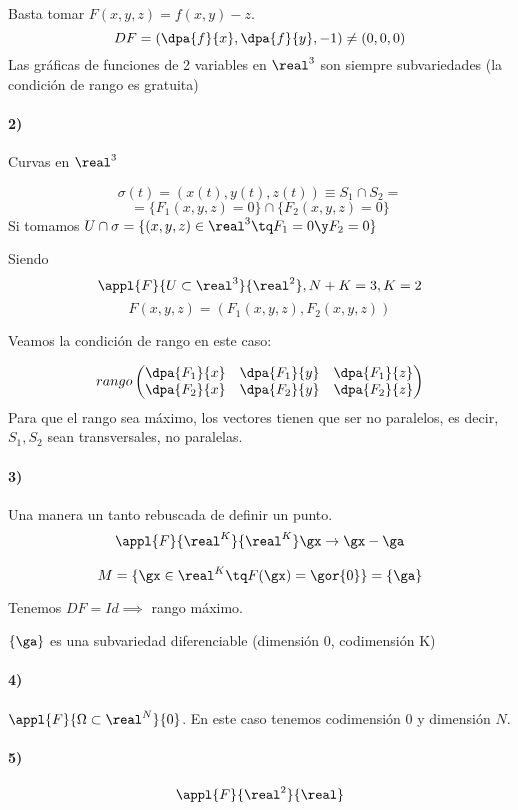   Basta tomar $F(x,y,z) = f(x,y)-z$.
  \[DF = \left(\dpa{f}{x},\dpa{f}{y},-1\right) \neq (0,0,0)\]
  Las gráficas de funciones de 2 variables en $\real^3$ son siempre subvariedades (la condición de rango es gratuita)
  
\paragraph{2)}  Curvas en $\real^3$
  
  \[\sigma(t) = (x(t),y(t),z(t))\equiv S_1 \cap S_2 = \]
  \[= \{F_1(x,y,z) = 0\}\cap \{F_2(x,y,z) = 0\}\]
  Si tomamos $U\cap \sigma = \{(x,y,z)\in\real^3 \tq F_1 = 0 \y F_2 = 0\}$

  Siendo \[\appl{F}{U\subset\real^3}{\real^2}, N+K=3,K=2\]\[F(x,y,z) = (F_1(x,y,z),F_2(x,y,z))\]
  
  Veamos la condición de rango en este caso:
  
  \[rango \begin{pmatrix} \dpa{F_1}{x}&\dpa{F_1}{y}&\dpa{F_1}{z}\\\dpa{F_2}{x}&\dpa{F_2}{y}&\dpa{F_2}{z}\end{pmatrix}\]
  Para que el rango sea máximo, los vectores tienen que ser no paralelos, es decir, $S_1, S_2$ sean transversales, no paralelas.
  
  \paragraph{3)} Una manera un tanto rebuscada de definir un punto.
 \begin{gather*}
 \appl{F}{\real^K}{\real^K}
 \gx \rightarrow \gx - \ga
 \end{gather*}  
 
 \[M = \{\gx \in \real^K \tq F(\gx) = \gor{0}\} = \{\ga\}\]
 
 Tenemos $DF = Id \implies $ rango máximo.
 
 $\{\ga\}$ es una subvariedad diferenciable (dimensión 0, codimensión K)
 
 \paragraph{4)} $\appl{F}{\Omega\subset\real^N}{0}$. En este caso tenemos codimensión $0$ y dimensión $N$.
 
\paragraph{5)}
   \[\appl{F}{\real^2}{\real}\]
  
